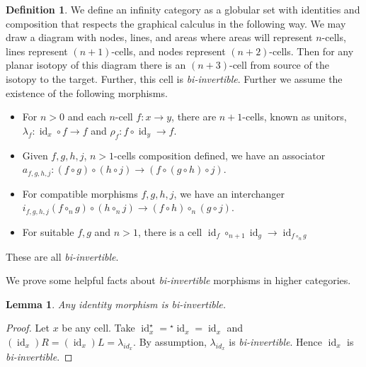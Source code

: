 \documentclass{article}
\newtheorem{lemma}{Lemma}
\theoremstyle{definition}
\newtheorem{definition}{Definition}
\theoremstyle{examplestyle}
\DeclareMathOperator{\id}{id}
\newcommand{\linv}[1]{{}^\star\!#1}
\newcommand{\rinv}[1]{#1^\star}
\begin{document}
\begin{definition}
  \label{def:higher-cat}
  We define an infinity category as a globular set with identities and composition that respects the graphical calculus in the following way. We may draw a diagram with nodes, lines, and areas where areas will represent \(n\)-cells, lines represent \((n+1)\)-cells, and nodes represent \((n+2)\)-cells. Then for any planar isotopy of this diagram there is an \((n+3)\)-cell from source of the isotopy to the target. Further, this cell is \emph{bi-invertible}. Further we assume the existence of the following morphisms.
  \begin{itemize}
  \item For \(n>0\) and each \(n\)-cell \(f: x \to y\), there are \(n+1\)-cells, known as unitors, \(\lambda_f: \id_x \circ f \to f\) and \(\rho_f: f \circ \id_y \to f\).
  \item Given \(f,g,h,j\), \(n>1\)-cells composition defined, we have an associator \(a_{f,g,h,j} : (f \circ g) \circ (h \circ j) \to (f \circ (g \circ h) \circ j)\).
  \item For compatible morphisms \(f,g,h,j\), we have an interchanger \(i_{f,g,h,j}(f \circ_n g) \circ (h \circ_n j) \to (f \circ h) \circ_n (g \circ j)\).
  \item For suitable \(f,g\) and \(n > 1\), there is a cell \(\id_f \circ_{n+1} \id_g \to \id_{f \circ_n g}\)
  \end{itemize}
  These are all \emph{bi-invertible}.
\end{definition}

We prove some helpful facts about \emph{bi-invertible} morphisms in higher categories.

\begin{lemma}
  \label{lem:identity}
  Any identity morphism is \emph{bi-invertible}.
\end{lemma}

\begin{proof}
  Let \(x\) be any cell. Take \(\rinv {\id_x} = \linv {\id_x} = \id_x\) and \((\id_x)R = (\id_x)L = \lambda_{id_x}\). By assumption, \(\lambda_{id_x}\) is \emph{bi-invertible}. Hence \(\id_x\) is \emph{bi-invertible}.
\end{proof}
\end{document}
